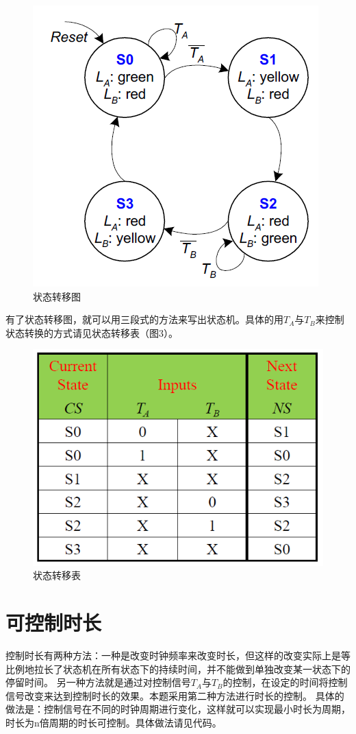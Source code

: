 \documentclass[a4paper]{article}
\begin{document}
		\begin{figure}[htbp]
			\centering
			\includegraphics[scale=0.8]{状态转移图.png}
			\caption{状态转移图}
		\end{figure}
		有了状态转移图，就可以用三段式的方法来写出状态机。具体的用$T_A$与$T_B$来控制状态转换的方式请见状态转移表（图3）。
		\begin{figure}[htbp]
			\centering
			\includegraphics[scale=0.6]{状态转移表.png}
			\caption{状态转移表}
		\end{figure}\par
	
	\section{可控制时长}
		控制时长有两种方法：一种是改变时钟频率来改变时长，但这样的改变实际上是等比例地拉长了状态机在所有状态下的持续时间，并不能做到单独改变某一状态下的停留时间。
		另一种方法就是通过对控制信号$T_A$与$T_B$的控制，在设定的时间将控制信号改变来达到控制时长的效果。本题采用第二种方法进行时长的控制。
		具体的做法是：控制信号在不同的时钟周期进行变化，这样就可以实现最小时长为周期，时长为n倍周期的时长可控制。具体做法请见代码。\par
	
\end{document}

